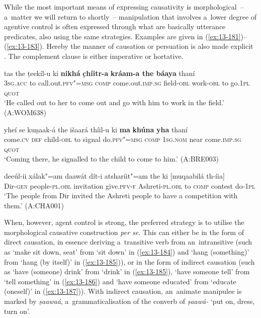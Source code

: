  While the most important means of expressing causativity is morphological~-- a~matter we will return to shortly~-- manipulation that involves a~lower degree of agentive control \citep[45]{givon2001b} is often expressed through what are basically utterance predicates, also using the same strategies. Examples are given in (\ref{ex:13-181})--(\ref{ex:13-183}). Hereby the manner of causation or persuation is also made explicit \citep[136]{noonan2007}. The complement clause is either imperative or hortative.

\begin{exe}
\ex
\label{ex:13-181}
\gll tas the ṭeekíl-u ki \textbf{nikhá} \textbf{c̣híitr-a} \textbf{ kráam-a the báaya} thaní \\
\textsc{3sg.acc} to call.out.\textsc{pfv"=msg} \textsc{comp} come.out.\textsc{imp.sg} field-\textsc{obl}  work-\textsc{obl} to go.\textsc{1pl} \textsc{quot} \\
\glt `He called out to her to come out and go with him to work in the field.' (A:WOM638)

\ex
\label{ex:13-182}
\gll yheí se kuṇaak-á the išaará thíil-u  ki \textbf{ma} \textbf{khúna} \textbf{yha} thaní \\
come.\textsc{cv} \textsc{def} child-\textsc{obl} to signal do.\textsc{pfv"=msg} \textsc{comp} \textsc{1sg.nom} near come.\textsc{imp.sg} \textsc{quot} \\
\glt `Coming there, he signalled to the child to come to him.' (A:BRE003)

\ex
\label{ex:13-183}
\gll deeúl-ii xálak"=am daawát dít-i  atsharíit"=am the ki [muqaabilá
  th-íia]\\
Dir-\textsc{gen}  people-\textsc{pl.obl} invitation give.\textsc{pfv-f} Ashreti-\textsc{pl.obl} to \textsc{comp} contest do-\textsc{1pl}\\
\glt `The people from Dir invited the Ashreti people to have a competition with them.' (A:CHA001) 
\end{exe}

When, however, agent control is strong, the preferred strategy is to utilise the morphological causative construction \textit{per se}. This can either be in the form of direct causation, in essence deriving a~transitive verb from an~intransitive (such as `make sit down, seat' from `sit down' in (\ref{ex:13-184}) and `hang (something)' from `hang (by itself)' in (\ref{ex:13-185})), or in the form of indirect causation (such as `have (someone) drink' from `drink' in (\ref{ex:13-185}), `have someone tell' from `tell something' in (\ref{ex:13-186}) and `have someone educated' from `educate (oneself)' in (\ref{ex:13-187})). With indirect causation, an~animate manipulee is marked by \textit{ṣaawaá}, a~grammaticalisation of the converb of \textit{ṣaawá-} `put on, dress, turn on'.

